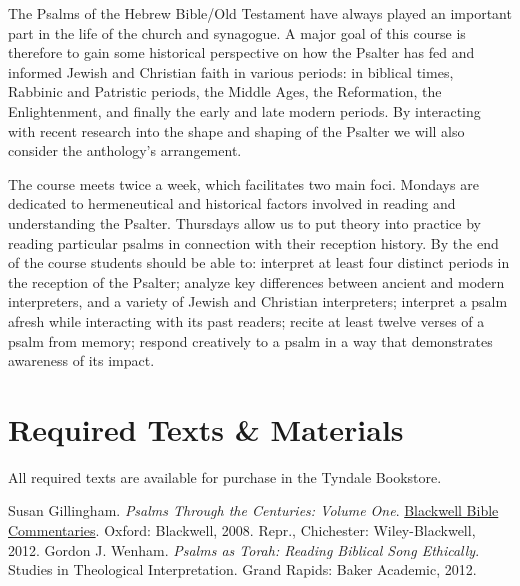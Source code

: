\documentclass[titlepage]{article}
\begin{document}
The Psalms of the Hebrew Bible/Old Testament have always played an
important part in the life of the church and synagogue. A major goal of
this course is therefore to gain some historical perspective on how the
Psalter has fed and informed Jewish and Christian faith in various
periods: in biblical times, Rabbinic and Patristic periods, the Middle
Ages, the Reformation, the Enlightenment, and finally the early and late
modern periods. By interacting with recent research into the shape and
shaping of the Psalter we will also consider the anthology's arrangement.

The course meets twice a week, which facilitates two main foci. Mondays
are dedicated to hermeneutical and historical factors involved in
reading and understanding the Psalter. Thursdays allow us to put theory
into practice by reading particular psalms in connection with their
reception history. By the end of the course students should be able to:
interpret at least four distinct periods in the reception of the
Psalter; analyze key differences between ancient and modern
interpreters, and a variety of Jewish and Christian interpreters;
interpret a psalm afresh while interacting with its past readers; recite
at least twelve verses of a psalm from memory; respond creatively to a
psalm in a way that demonstrates awareness of its impact.

\section{Required Texts \& Materials}
\label{texts}

All required texts are available for purchase in the Tyndale Bookstore.

\begingroup
\renewcommand{\section}[2]{}%
\begin{thebibliography}{Gillingham}%
    Susan Gillingham. \emph{Psalms Through the Centuries: Volume One}.
    \href{http://bbibcomm.net/}{Blackwell Bible Commentaries}. Oxford:
    Blackwell, 2008. Repr., Chichester: Wiley-Blackwell, 2012.
    Gordon J. Wenham. \emph{Psalms as Torah: Reading Biblical Song
    Ethically}. Studies in Theological Interpretation. Grand Rapids:
    Baker Academic, 2012.
\end{thebibliography}
\endgroup
\end{document}
